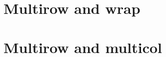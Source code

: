 \documentclass[]{article}
\begin{document}
\FloatBarrier

\hypertarget{multirow-and-wrap}{%
\section{Multirow and wrap}\label{multirow-and-wrap}}

\FloatBarrier

\hypertarget{multirow-and-multicol}{%
\section{Multirow and multicol}\label{multirow-and-multicol}}

 
  \providecommand{\huxb}[2]{\arrayrulecolor[RGB]{#1}\global\arrayrulewidth=#2pt}
  \providecommand{\huxvb}[2]{\color[RGB]{#1}\vrule width #2pt}
  \providecommand{\huxtpad}[1]{\rule{0pt}{#1}}
  \providecommand{\huxbpad}[1]{\rule[-#1]{0pt}{#1}}
\end{document}
